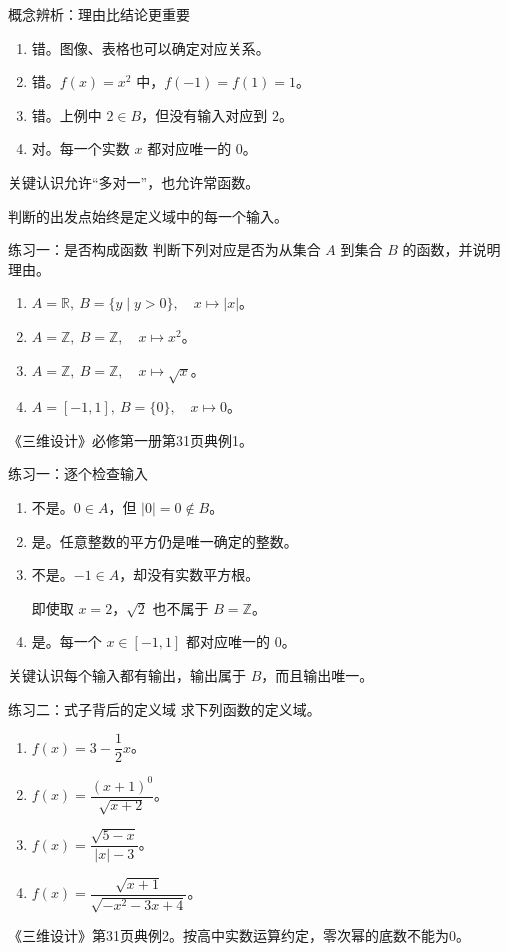 \documentclass[aspectratio=169,10pt]{beamer}
\newcommand{\R}{\mathbb R}
\newcommand{\Z}{\mathbb Z}
\newcommand{\src}[1]{\par\vfill{\tiny\color{gray}#1}}
\newcommand{\key}[1]{\begin{block}{关键认识}#1\end{block}}
\begin{document}
\begin{frame}[t]{概念辨析：理由比结论更重要}
\begin{enumerate}
\item 错。图像、表格也可以确定对应关系。
\item 错。$f(x)=x^2$ 中，$f(-1)=f(1)=1$。
\item 错。上例中 $2\in B$，但没有输入对应到 $2$。
\item 对。每一个实数 $x$ 都对应唯一的 $0$。
\end{enumerate}
\key{允许“多对一”，也允许常函数。\par
判断的出发点始终是定义域中的每一个输入。}
\end{frame}
\begin{frame}[t]{练习一：是否构成函数}
判断下列对应是否为从集合 $A$ 到集合 $B$ 的函数，并说明理由。
\begin{enumerate}
\item $A=\R,\ B=\{y\mid y>0\},\quad x\mapsto |x|$。
\item $A=\Z,\ B=\Z,\quad x\mapsto x^2$。
\item $A=\Z,\ B=\Z,\quad x\mapsto \sqrt{x}$。
\item $A=[-1,1],\ B=\{0\},\quad x\mapsto 0$。
\end{enumerate}
\src{《三维设计》必修第一册第31页典例1。}
\end{frame}
\begin{frame}[t]{练习一：逐个检查输入}
\begin{enumerate}
\item 不是。$0\in A$，但 $|0|=0\notin B$。
\item 是。任意整数的平方仍是唯一确定的整数。
\item 不是。$-1\in A$，却没有实数平方根。\par
即使取 $x=2$，$\sqrt2$ 也不属于 $B=\Z$。
\item 是。每一个 $x\in[-1,1]$ 都对应唯一的 $0$。
\end{enumerate}
\key{每个输入都有输出，输出属于 $B$，而且输出唯一。}
\end{frame}
\begin{frame}[t]{练习二：式子背后的定义域}
求下列函数的定义域。
\begin{enumerate}
\item $f(x)=3-\dfrac12x$。
\item $f(x)=\dfrac{(x+1)^0}{\sqrt{x+2}}$。
\item $f(x)=\dfrac{\sqrt{5-x}}{|x|-3}$。
\item $f(x)=\dfrac{\sqrt{x+1}}{\sqrt{-x^2-3x+4}}$。
\end{enumerate}
\src{《三维设计》第31页典例2。按高中实数运算约定，零次幂的底数不能为0。}
\end{frame}
\end{document}
